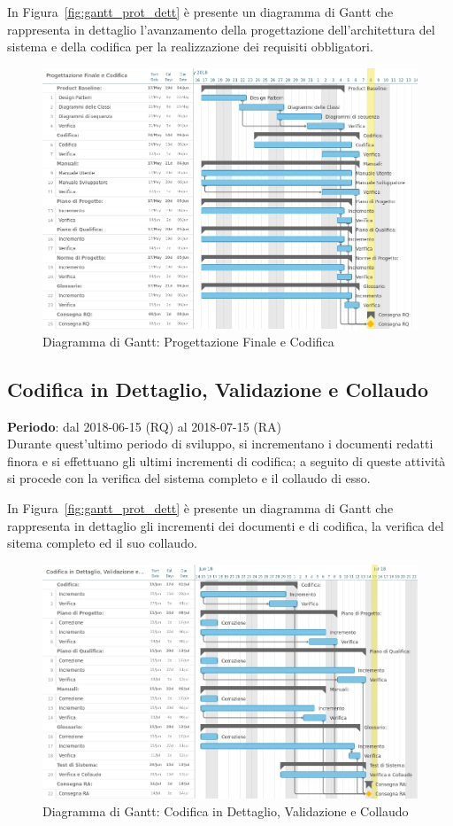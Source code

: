 In Figura~\ref{fig:gantt_prot_dett} è presente un diagramma di Gantt che rappresenta in dettaglio l'avanzamento della progettazione dell'architettura del sistema e della codifica per la realizzazione dei requisiti obbligatori.

\begin{figure}[h!]
	\centerline{\includegraphics[scale=0.5]{img/DiagrammiGantt/ProgettazioneFinaleCodifica.jpg}}
	\caption{Diagramma di Gantt: Progettazione Finale e Codifica}
	\label{fig:gantt_prog_fin_cod}
\end{figure}
\clearpage

\subsection{Codifica in Dettaglio, Validazione e Collaudo}
\textbf{Periodo}: dal 2018-06-15 (RQ) al 2018-07-15 (RA)\\

Durante quest'ultimo periodo di sviluppo, si incrementano i documenti redatti finora e si effettuano gli ultimi incrementi di codifica; a seguito di queste attività si procede con la verifica del sistema completo e il collaudo di esso.

In Figura~\ref{fig:gantt_prot_dett} è presente un diagramma di Gantt che rappresenta in dettaglio gli incrementi dei documenti e di codifica, la verifica del sitema completo ed il suo collaudo.

\begin{figure}[h!]
	\centerline{\includegraphics[scale=0.5]{img/DiagrammiGantt/CodificaValidazioneCollaudo.jpg}}
	\caption{Diagramma di Gantt: Codifica in Dettaglio, Validazione e Collaudo}
	\label{fig:gantt_cod_valid_coll}
\end{figure}
\clearpage
